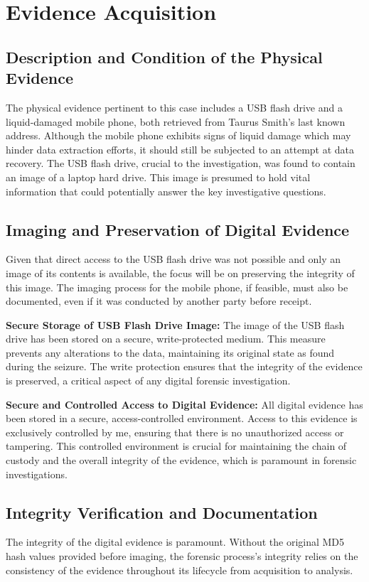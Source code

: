 \chapter{Evidence Acquisition}

\section{Description and Condition of the Physical Evidence}
The physical evidence pertinent to this case includes a USB flash drive and a liquid-damaged mobile phone, both retrieved from Taurus Smith's last known address. Although the mobile phone exhibits signs of liquid damage which may hinder data extraction efforts, it should still be subjected to an attempt at data recovery. The USB flash drive, crucial to the investigation, was found to contain an image of a laptop hard drive. This image is presumed to hold vital information that could potentially answer the key investigative questions.

\section{Imaging and Preservation of Digital Evidence}
Given that direct access to the USB flash drive was not possible and only an image of its contents is available, the focus will be on preserving the integrity of this image. The imaging process for the mobile phone, if feasible, must also be documented, even if it was conducted by another party before receipt.

\textbf{Secure Storage of USB Flash Drive Image:} The image of the USB flash drive has been stored on a secure, write-protected medium. This measure prevents any alterations to the data, maintaining its original state as found during the seizure. The write protection ensures that the integrity of the evidence is preserved, a critical aspect of any digital forensic investigation.

\textbf{Secure and Controlled Access to Digital Evidence:} All digital evidence has been stored in a secure, access-controlled environment. Access to this evidence is exclusively controlled by me, ensuring that there is no unauthorized access or tampering. This controlled environment is crucial for maintaining the chain of custody and the overall integrity of the evidence, which is paramount in forensic investigations.

\section{Integrity Verification and Documentation}
The integrity of the digital evidence is paramount. Without the original MD5 hash values provided before imaging, the forensic process's integrity relies on the consistency of the evidence throughout its lifecycle from acquisition to analysis.